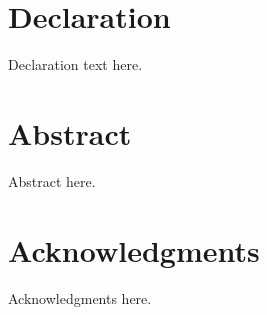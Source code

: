 \frontmatter

\maketitle

\section*{Declaration}
Declaration text here.

\section*{Abstract}
Abstract here.

\section*{Acknowledgments}
Acknowledgments here.